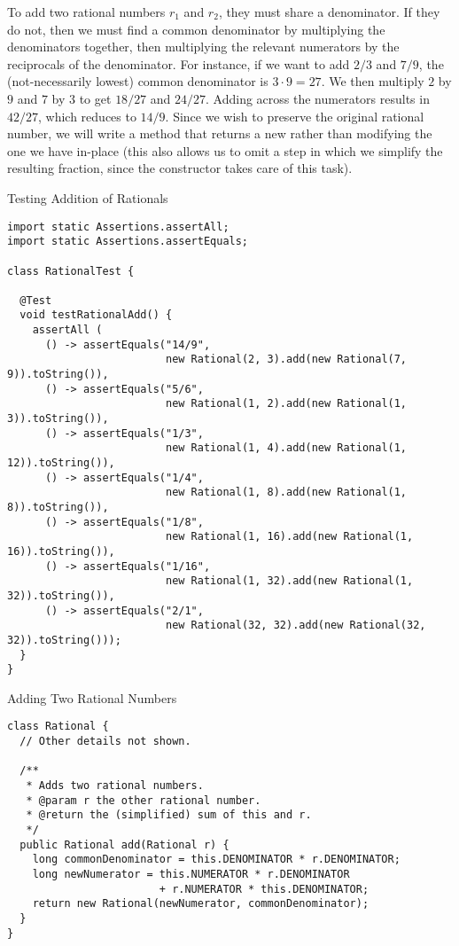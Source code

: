To add two rational numbers $r_1$ and $r_2$, they must share a denominator. If they do not, then we must find a common denominator by multiplying the denominators together, then multiplying the relevant numerators by the reciprocals of the denominator. For instance, if we want to add $2/3$ and $7/9$, the (not-necessarily lowest) common denominator is $3\cdot{9} = 27$. We then multiply $2$ by $9$ and $7$ by $3$ to get $18/27$ and $24/27$. Adding across the numerators results in $42/27$, which reduces to $14/9$. Since we wish to preserve the original rational number, we will write a method that returns a new  rather than modifying the one we have in-place (this also allows us to omit a step in which we simplify the resulting fraction, since the constructor takes care of this task).

\begin{cl}[]{Testing Addition of Rationals}
\begin{lstlisting}[language=MyJava]
import static Assertions.assertAll;
import static Assertions.assertEquals;

class RationalTest {

  @Test
  void testRationalAdd() {
    assertAll (
      () -> assertEquals("14/9", 
                         new Rational(2, 3).add(new Rational(7, 9)).toString()),
      () -> assertEquals("5/6", 
                         new Rational(1, 2).add(new Rational(1, 3)).toString()),
      () -> assertEquals("1/3", 
                         new Rational(1, 4).add(new Rational(1, 12)).toString()),
      () -> assertEquals("1/4", 
                         new Rational(1, 8).add(new Rational(1, 8)).toString()),
      () -> assertEquals("1/8", 
                         new Rational(1, 16).add(new Rational(1, 16)).toString()),
      () -> assertEquals("1/16", 
                         new Rational(1, 32).add(new Rational(1, 32)).toString()),
      () -> assertEquals("2/1", 
                         new Rational(32, 32).add(new Rational(32, 32)).toString()));
  }
}
\end{lstlisting}
\end{cl}

\begin{cl}[]{Adding Two Rational Numbers}
\begin{lstlisting}[language=MyJava]
class Rational {
  // Other details not shown.

  /**
   * Adds two rational numbers.
   * @param r the other rational number.
   * @return the (simplified) sum of this and r.
   */
  public Rational add(Rational r) {
    long commonDenominator = this.DENOMINATOR * r.DENOMINATOR;
    long newNumerator = this.NUMERATOR * r.DENOMINATOR 
                        + r.NUMERATOR * this.DENOMINATOR;
    return new Rational(newNumerator, commonDenominator);
  }
}
\end{lstlisting}
\end{cl}

